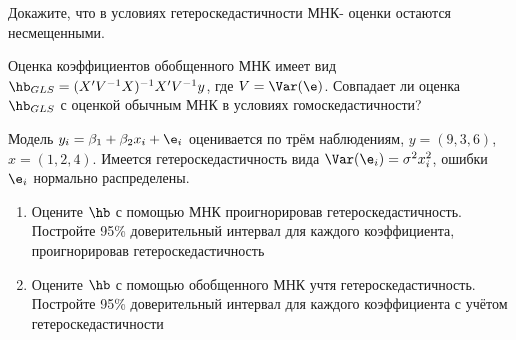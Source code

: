 \documentclass[pdftex,11pt,openany]{book}\usepackage[]{graphicx}\usepackage[]{color}
\begin{document}
\begin{problem}
Докажите, что в условиях гетероскедастичности МНК-
оценки остаются несмещенными.
\end{problem}

\begin{solution}
\end{solution}


\begin{problem}
Оценка коэффициентов обобщенного МНК имеет вид $\hb_{GLS}=(X'V^{-1}X)^{-1}X'V^{-1}y$, где $V=\Var(\e)$. Совпадает ли оценка $\hb_{GLS}$ с оценкой обычным МНК в условиях гомоскедастичности?
\end{problem}

\begin{solution}
\end{solution}


\begin{problem}
Модель $y_i=\beta_1 + \beta_2 x_i +\e_i$ оценивается по трём наблюдениям, $y=(9,3,6)$, $x=(1,2,4)$. Имеется гетероскедастичность вида $\Var(\e_i)=\sigma^2 x_i^2$, ошибки $\e_i$ нормально распределены.
\begin{enumerate}
\item Оцените $\hb$ с помощью МНК проигнорировав гетероскедастичность. Постройте 95\% доверительный интервал для каждого коэффициента, проигнорировав гетероскедастичность
\item Оцените $\hb$ с помощью обобщенного МНК учтя гетероскедастичность. Постройте 95\% доверительный интервал для каждого коэффициента с учётом гетероскедастичности
\end{enumerate}
\end{problem}

\begin{solution}
\end{solution}
\end{document}
